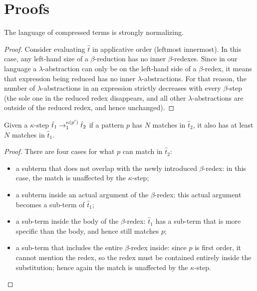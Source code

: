 \section{Proofs}\label{app:proofs}

\begin{proposition}
  The language of compressed terms is strongly normalizing.
\end{proposition}

\begin{proof}
  Consider evaluating $\hat{t}$ in applicative order (leftmost innermost).
  In this case, any left-hand size of a $\beta$-reduction has no inner $\beta$-redexes.
  Since in our language a $\lambda$-abstraction can only be on the left-hand side of a $\beta$-redex,
  it means that expression being reduced has no inner $\lambda$-abstractions.
  For that reason, the number of $\lambda$-abstractions in an expression strictly decreases with every $\beta$-step
  (the sole one in the reduced redex disappears, and all other $\lambda$-abstractions are outside of the reduced redex, and hence unchanged).
\end{proof}

\begin{lemma}
Given a $\kappa$-step $\hat{t}_1 \rightarrow^{\kappa(p')}_1 \hat{t}_2$
  if a pattern $p$ has $N$ matches in $\hat{t}_2$, it also has at least $N$ matches in $\hat{t}_1$.
  \label{lem:pat-match}
\end{lemma}
\begin{proof}
  There are four cases for what $p$ can match in $\hat{t}_2$:
  \begin{itemize}
  \item a subterm that does not overlap with the newly introduced $\beta$-redex: in this case, the match is unaffected by the $\kappa$-step;
  \item a subterm inside an actual argument of the $\beta$-redex: this actual argument becomes a sub-term of $\hat{t}_1$;
  \item a sub-term inside the body of the $\beta$-redex: $\hat{t}_1$ has a sub-term that is more specific than the body, and hence still matches $p$;
  \item a sub-term that includes the entire $\beta$-redex inside: since $p$ is first order, it cannot mention the redex, so the redex must be contained entirely inside the substitution; 
  hence again the match is unaffected by the $\kappa$-step.
  \end{itemize}
\end{proof}

